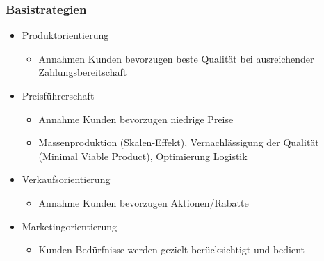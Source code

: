     \subsubsection{Basistrategien}
    \begin{itemize}
        \item Produktorientierung
        \begin{itemize}
            \item Annahmen Kunden bevorzugen beste Qualität bei ausreichender Zahlungsbereitschaft
        \end{itemize}
        \item Preisführerschaft
        \begin{itemize}
            \item Annahme Kunden bevorzugen niedrige Preise
            \item Massenproduktion (Skalen-Effekt), Vernachlässigung der Qualität (Minimal Viable Product), Optimierung Logistik
        \end{itemize}
        \item Verkaufsorientierung
        \begin{itemize}
            \item Annahme Kunden bevorzugen Aktionen/Rabatte
        \end{itemize}
        \item Marketingorientierung
        \begin{itemize}
            \item Kunden Bedürfnisse werden gezielt berücksichtigt und bedient 
        \end{itemize}
    \end{itemize}
